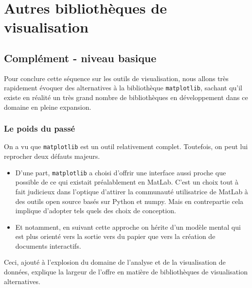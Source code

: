     
    
    
    

    

    \hypertarget{autres-bibliothuxe8ques-de-visualisation}{%
\section{Autres bibliothèques de
visualisation}\label{autres-bibliothuxe8ques-de-visualisation}}

    \hypertarget{compluxe9ment---niveau-basique}{%
\subsection{Complément - niveau
basique}\label{compluxe9ment---niveau-basique}}

    Pour conclure cette séquence sur les outils de visualisation, nous
allons très rapidement évoquer des alternatives à la bibliothèque
\texttt{matplotlib}, sachant qu'il existe en réalité un très grand
nombre de bibliothèques en développement dans ce domaine en pleine
expansion.

    \hypertarget{le-poids-du-passuxe9}{%
\subsubsection{Le poids du passé}\label{le-poids-du-passuxe9}}

    On a vu que \texttt{matplotlib} est un outil relativement complet.
Toutefois, on peut lui reprocher deux défauts majeurs.

\begin{itemize}
\item
  D'une part, \texttt{matplotlib} a choisi d'offrir une interface aussi
  proche que possible de ce qui existait préalablement en MatLab. C'est
  un choix tout à fait judicieux dans l'optique d'attirer la communauté
  utilisatrice de MatLab à des outils open source basés sur Python et
  numpy. Mais en contrepartie cela implique d'adopter tels quels des
  choix de conception.
\item
  Et notamment, en suivant cette approche on hérite d'un modèle mental
  qui est plus orienté vers la sortie vers du papier que vers la
  création de documents interactifs.
\end{itemize}

    Ceci, ajouté à l'explosion du domaine de l'analyse et de la
visualisation de données, explique la largeur de l'offre en matière de
bibliothèques de visualisation alternatives.

